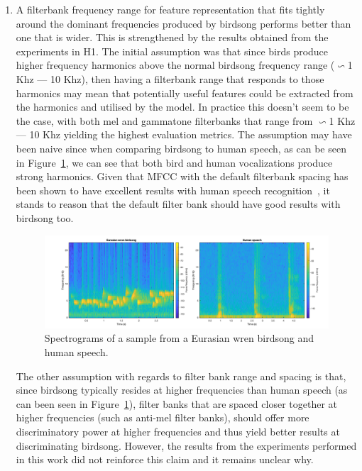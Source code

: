\begin{enumerate}

  \item A filterbank frequency range for feature representation that fits
    tightly around the dominant frequencies produced by birdsong performs better
    than one that is wider. This is strengthened by the results obtained from
    the experiments in H1. The initial assumption was that since birds produce
    higher frequency harmonics above the normal birdsong frequency range
    ($\backsim$1 Khz --- 10 Khz), then having a filterbank range that responds
    to those harmonics may mean that potentially useful features could be
    extracted from the harmonics and utilised by the model. In practice this
    doesn't seem to be the case, with both mel and gammatone filterbanks that
    range from $\backsim$1 Khz --- 10 Khz yielding the highest evaluation
    metrics. The assumption may have been naive since when comparing birdsong to
    human speech, as can be seen in Figure~\ref{fig:wren_vs_human}, we can see
    that both bird and human vocalizations produce strong harmonics. Given that
    MFCC with the default filterbank spacing has been shown to have excellent
    results with human speech recognition~\cite{muda2010voice}, it stands to
    reason that the default filter bank should have good results with birdsong
    too.

    \begin{figure}[ht]
      \centering
      \includegraphics[width=\textwidth]{figures/wren_vs_human.png}
      \caption{Spectrograms of a sample from a Eurasian wren birdsong and human
      speech.}\label{fig:wren_vs_human}
    \end{figure}

    The other assumption with regards to filter bank range and spacing is that,
    since birdsong typically resides at higher frequencies than human speech (as
    can been seen in Figure~\ref{fig:wren_vs_human}), filter banks that are
    spaced closer together at higher frequencies (such as anti-mel filter
    banks), should offer more discriminatory power at higher frequencies and
    thus yield better results at discriminating birdsong. However, the results
    from the experiments performed in this work did not reinforce this claim and
    it remains unclear why.


\end{enumerate}
